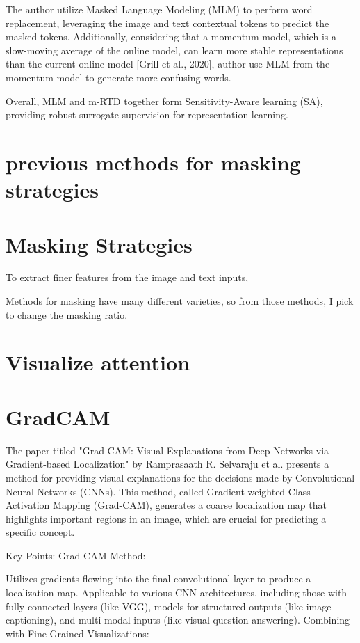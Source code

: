 The author utilize Masked Language Modeling (MLM) to perform word replacement, leveraging the image and text contextual tokens to predict the masked tokens. Additionally, considering that a momentum model, which is a slow-moving average of the online model, can learn more stable representations than the current online model [Grill et al., 2020], author use MLM from the momentum model to generate more confusing words. 

Overall, MLM and m-RTD together form Sensitivity-Aware learning (SA), providing robust surrogate supervision for representation learning.


\section{previous methods for masking strategies}


\section{Masking Strategies}
To extract finer features from the image and text inputs, 

Methods for masking have many different varieties, so from those methods, I pick to change the masking ratio.

\section{Visualize attention}
\section{GradCAM}
The paper titled "Grad-CAM: Visual Explanations from Deep Networks via Gradient-based Localization" by Ramprasaath R. Selvaraju et al. presents a method for providing visual explanations for the decisions made by Convolutional Neural Networks (CNNs). This method, called Gradient-weighted Class Activation Mapping (Grad-CAM), generates a coarse localization map that highlights important regions in an image, which are crucial for predicting a specific concept.

Key Points:
Grad-CAM Method:

Utilizes gradients flowing into the final convolutional layer to produce a localization map.
Applicable to various CNN architectures, including those with fully-connected layers (like VGG), models for structured outputs (like image captioning), and multi-modal inputs (like visual question answering).
Combining with Fine-Grained Visualizations:

